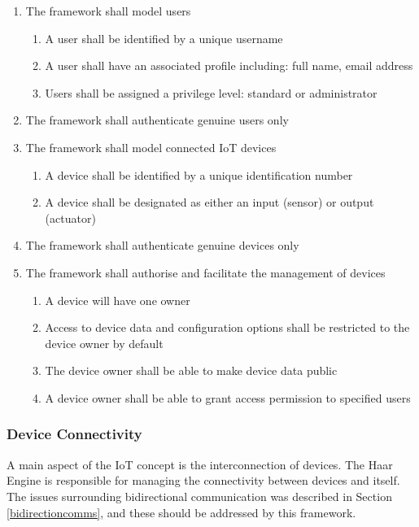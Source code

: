        \begin{enumerate}
          \item The framework shall model users
          \begin{enumerate}
            \item A user shall be identified by a unique username
            \item A user shall have an associated profile including: full name, email address
            \item Users shall be assigned a privilege level: standard or administrator
          \end{enumerate}
          \item The framework shall authenticate genuine users only

          \item The framework shall model connected IoT devices
          \begin{enumerate}
            \item A device shall be identified by a unique identification number
            \item A device shall be designated as either an input (sensor) or output (actuator)
          \end{enumerate}
          \item The framework shall authenticate genuine devices only

          \item The framework shall authorise and facilitate the management of devices
          \begin{enumerate}
            \item A device will have one owner
            \item Access to device data and configuration options shall be restricted to the device owner by default
            \item The device owner shall be able to make device data public
            \item A device owner shall be able to grant access permission to specified users
          \end{enumerate}
        \end{enumerate}

      \subsubsection{Device Connectivity}
        A main aspect of the IoT concept is the interconnection of devices. The Haar Engine is responsible for managing the connectivity between devices and itself. The issues surrounding bidirectional communication was described in Section \ref{bidirectioncomms}, and these should be addressed by this framework.

